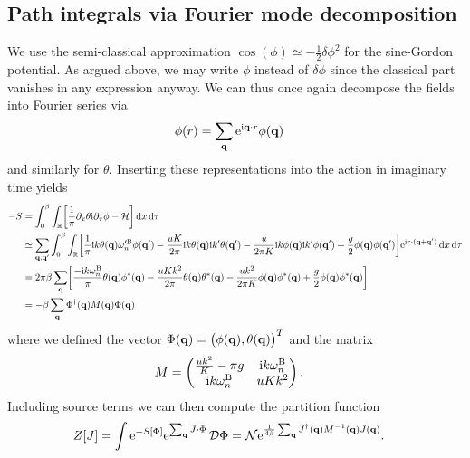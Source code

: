 \documentclass[english, parskip=full]{scrartcl}
\begin{document}
\subsection{Path integrals via Fourier mode decomposition}
We use the semi-classical approximation $\cos(\phi) \simeq -\frac{1}{2} \delta\phi^2$ for the sine-Gordon potential.
As argued above, we may write $\phi$ instead of $\delta\phi$ since the classical part vanishes in any expression anyway.
We can thus once again decompose the fields into Fourier series via
\begin{align}
\phi(r) &= \sum_\textbf{q} \powe{\i \textbf{q}\cdot r} \phi(\textbf{q})
\end{align}
and similarly for $\theta$.
Inserting these representations into the action in imaginary time yields
\begin{align}
-S &= \intx{0}{\beta}{\intr{\klb*{\frac{1}{\pi} \partial_x\theta \i\partial_\tau\phi - \mathcal{H}}}{x} }{\tau}\\
&\simeq \sum_{\textbf{q},\textbf{q}'} \intx{0}{\beta}{\intr{\klb*{\frac{1}{\pi} \i k\theta(\textbf{q}) \omega_n'^\B \phi(\textbf{q}') - \frac{uK}{2\pi} \i k\theta(\textbf{q}) \i k'\theta(\textbf{q}') - \frac{u}{2\pi K} \i k\phi(\textbf{q}) \i k' \phi(\textbf{q}') + \frac{g}{2} \phi(\textbf{q}) \phi(\textbf{q}')} \powe{\i r\cdot (\textbf{q} + \textbf{q}')}}{x} }{\tau}\\
&= 2\pi\beta\sum_\textbf{q} \klb*{\frac{-\i k\omega_n^\B}{\pi} \theta(\textbf{q}) \phi^\ast(\textbf{q}) - \frac{uKk^2}{2\pi} \theta(\textbf{q}) \theta^\ast(\textbf{q}) - \frac{uk^2}{2\pi K} \phi(\textbf{q}) \phi^\ast(\textbf{q}) + \frac{g}{2} \phi(\textbf{q}) \phi^\ast(\textbf{q})}\\
&= -\beta \sum_\textbf{q} \Phi^\dagger(\textbf{q}) M(\textbf{q}) \Phi(\textbf{q})
\end{align}
where we defined the vector $\Phi(\textbf{q}) = \kla[\big]{\phi(\textbf{q}), \theta(\textbf{q})}^T$ and the matrix
\begin{align}
M &= \begin{pmatrix}
\frac{uk^2}{K} - \pi g & \i k\omega_n^\B \\ \i k\omega_n^\B & uKk^2
\end{pmatrix}.
\end{align}
Including source terms we can then compute the partition function
\begin{align}
Z[J] &= \int \powe{-S[\Phi]} \powe{\sum_\textbf{q} J\cdot \Phi} \,\mathcal{D}\Phi = \mathcal{N} \powe{\frac{1}{4\beta} \sum_\textbf{q} J^\dagger(\textbf{q}) M^{-1}(\textbf{q}) J(\textbf{q})}.
\end{align}
\end{document}
